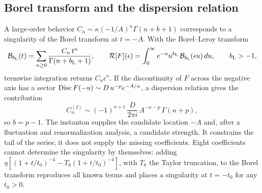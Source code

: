 \subsection{Borel transform and the dispersion relation}
A large-order behavior $C_n\sim\kappa(-1/A)^n\Gamma(n+b+1)$ corresponds to a singularity
of the Borel transform at $t=-A$. With the Borel--Leroy transform
\begin{equation}
 \mathcal B_{b_{\mathrm L}}(t)=\sum_{n\ge0}\frac{C_n\,t^n}{\Gamma(n+b_{\mathrm L}+1)},\qquad
 \mathcal R[F](\epsilon)=\int_0^\infty e^{-u}u^{b_{\mathrm L}}\,\mathcal B_{b_{\mathrm L}}(\epsilon u)\,d u,
 \qquad b_{\mathrm L}>-1,
 \label{rs:eq:borel}
\end{equation}
termwise integration returns $C_n\epsilon^n$. If the discontinuity of $F$ across the
negative axis has a sector $\operatorname{Disc} F(-u)\sim D\,u^{-p}e^{-A/u}$, a dispersion relation
gives the contribution
\begin{equation}
 C_n^{(I)}\sim(-1)^{n+1}\,\frac{D}{2\pi i}\,A^{-n-p}\,\Gamma(n+p),
 \label{rs:eq:dispersion}
\end{equation}
so $b=p-1$. The instanton supplies the candidate location $-A$ and, after a fluctuation and
renormalization analysis, a candidate strength. It constrains the tail of the series; it
does not supply the missing coefficients. Eight coefficients cannot determine the
singularity by themselves: adding $\eta[(1+t/t_0)^{-4}-T_8(1+t/t_0)^{-4}]$, with $T_8$
the Taylor truncation, to the Borel transform reproduces all known terms and places a
singularity at $t=-t_0$ for any $t_0>0$.

